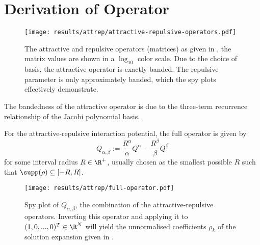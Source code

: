 





\pagebreak
\section{Derivation of Operator}



\begin{figure}[H]
  \centering
  \label{fig:attractive-repulsive}
  \texttt{[image: results/attrep/attractive-repulsive-operators.pdf]}
  \caption[Attractive and repulsive operators.]{The attractive and repulsive operators (matrices) as given in , the matrix values are shown in a $\log_{10}$ color scale. Due to the choice of basis, the attractive operator is exactly banded. The repulsive parameter is only approximately banded, which the spy plots effectively demonstrate.}
\end{figure}

The bandedness of the attractive operator is due to the three-term recurrence relationship of the Jacobi polynomial basis.

For the attractive-repulsive interaction potential, the full operator is given by
\begin{equation}
  Q_{\alpha, \beta} := \frac{R^\alpha}{\alpha} Q^\alpha - \frac{R^\beta}{\beta} Q^\beta
  \label{eq:full-attrep-operator}
\end{equation}
for some interval radius $R \in \R^+$, usually chosen as the smallest possible $R$ such that $\supp(\rho) \subseteq [-R, R]$.

\begin{figure}[H]
  \centering
  \label{fig:attrep-operator}
  \texttt{[image: results/attrep/full-operator.pdf]}
  \caption[Combination of the attractive-repulsive operators]{Spy plot of $Q_{\alpha, \beta}$, the combination of the attractive-repulsive operators. Inverting this operator and applying it to $(1, 0, ..., 0)^T \in \R^N$ will yield the unnormalised coefficients $\rho_k$ of the solution expansion given in .}
\end{figure}

